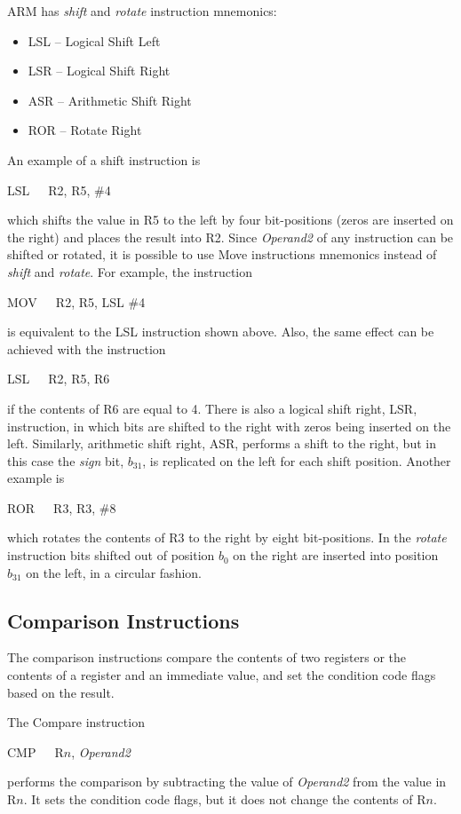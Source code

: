 \documentclass[11pt, twoside, pdftex]{article}
\begin{document}
ARM has {\it shift} and {\it rotate} instruction mnemonics:
\begin{itemize}
\item LSL -- Logical Shift Left
\item LSR -- Logical Shift Right
\item ASR -- Arithmetic Shift Right
\item ROR -- Rotate Right
\end{itemize}
\noindent
An example of a shift instruction is
\begin{center}
LSL~~~R2, R5, \#4
\end{center}
\noindent
which shifts the value in R5 to the left by four bit-positions (zeros are
inserted on the right) and places the result into R2. 
Since {\it Operand2} of any instruction can be shifted or rotated, it is
possible to use Move instructions mnemonics instead of {\it shift} and {\it rotate}.
For example, the instruction
\begin{center}
MOV~~~R2, R5, LSL \#4
\end{center}
is equivalent to the LSL instruction shown above. Also, the
same effect can be achieved with the instruction
\begin{center}
LSL~~~R2, R5, R6
\end{center}
\noindent
if the contents of R6 are equal to 4. There is also a logical shift right, LSR,
instruction, in which bits are shifted to the right with zeros being inserted on the left. 
Similarly, arithmetic shift right, ASR, performs a shift to the right, but
in this case the {\it sign} bit, $b_{31}$, is replicated on the left for each shift position.
Another example is 
\begin{center}
ROR~~~R3, R3, \#8
\end{center}
\noindent
which rotates the contents of R3 to the right by eight bit-positions.  In the {\it rotate}
instruction bits shifted out of position $b_0$ on the right are inserted into position
$b_{31}$ on the left, in a circular fashion.

\subsection{Comparison Instructions}
\label{sec:compare}

The comparison instructions compare the contents of two registers
or the contents of a register and an immediate value, and set the 
condition code flags based on the result.

The Compare instruction
\begin{center}
		  CMP~~~R$n$, {\it Operand2}
\end{center}
\noindent 
performs the comparison by subtracting the value of {\it Operand2} from the value 
in R$n$. It sets the condition code flags, but it does not change the contents of R$n$.
\end{document}
